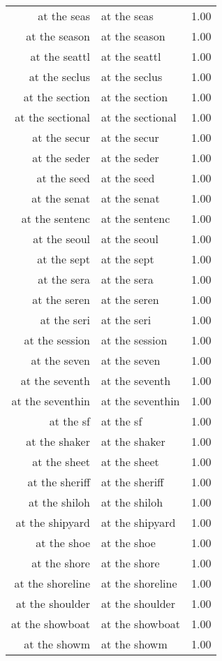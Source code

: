 \begin{table}[ht]
\begin{tabular}{rlr}
  at the seas & at the seas & 1.00 \\ 
  at the season & at the season & 1.00 \\ 
  at the seattl & at the seattl & 1.00 \\ 
  at the seclus & at the seclus & 1.00 \\ 
  at the section & at the section & 1.00 \\ 
  at the sectional & at the sectional & 1.00 \\ 
  at the secur & at the secur & 1.00 \\ 
  at the seder & at the seder & 1.00 \\ 
  at the seed & at the seed & 1.00 \\ 
  at the senat & at the senat & 1.00 \\ 
  at the sentenc & at the sentenc & 1.00 \\ 
  at the seoul & at the seoul & 1.00 \\ 
  at the sept & at the sept & 1.00 \\ 
  at the sera & at the sera & 1.00 \\ 
  at the seren & at the seren & 1.00 \\ 
  at the seri & at the seri & 1.00 \\ 
  at the session & at the session & 1.00 \\ 
  at the seven & at the seven & 1.00 \\ 
  at the seventh & at the seventh & 1.00 \\ 
  at the seventhin & at the seventhin & 1.00 \\ 
  at the sf & at the sf & 1.00 \\ 
  at the shaker & at the shaker & 1.00 \\ 
  at the sheet & at the sheet & 1.00 \\ 
  at the sheriff & at the sheriff & 1.00 \\ 
  at the shiloh & at the shiloh & 1.00 \\ 
  at the shipyard & at the shipyard & 1.00 \\ 
  at the shoe & at the shoe & 1.00 \\ 
  at the shore & at the shore & 1.00 \\ 
  at the shoreline & at the shoreline & 1.00 \\ 
  at the shoulder & at the shoulder & 1.00 \\ 
  at the showboat & at the showboat & 1.00 \\ 
  at the showm & at the showm & 1.00 \\ 

\end{tabular}
\end{table}
